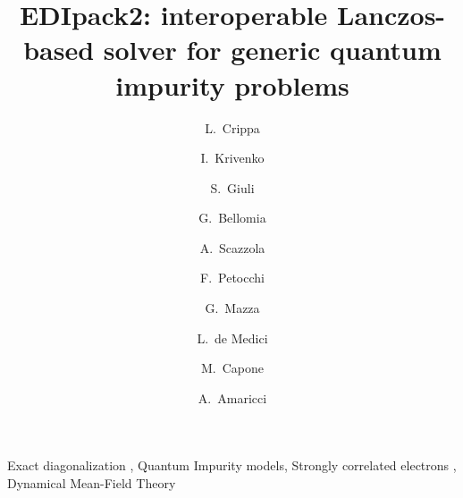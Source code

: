 \documentclass[final,3p,10pt]{elsarticle}
\begin{document}
\begin{frontmatter}

\title{EDIpack2: interoperable Lanczos-based solver for generic quantum impurity problems}
\author[a,b,c]{L.~Crippa}
\author[a]{I.~Krivenko}
\author[d]{S.~Giuli}
\author[d]{G.~Bellomia}
\author[e]{A.~Scazzola}
\author[f]{F.~Petocchi}
\author[g]{G.~Mazza}
\author[h]{L.~de Medici}
\author[d]{M.~Capone}
\author[i]{A.~Amaricci}

\newcommand{\CNRIOM}{CNR-IOM, Istituto Officina dei Materiali,
  Consiglio Nazionale delle Ricerche, Via Bonomea 265, 34136
  Trieste, Italy}
\newcommand{\SISSA}{Scuola Internazionale Superiore di Studi Avanzati (SISSA),
  Via Bonomea 265, 34136 Trieste, Italy}
\newcommand{\ITPHamburg}{I. Institute of Theoretical Physics,
  University of Hamburg, Notkestrasse 9, 22607 Hamburg, Germany}
\newcommand{\WZBURG}{Institut f\"ur Theoretische Physik und
  Astrophysik,Universit\"at W\"urzburg, 97074 W\"urzburg, Germany}
\newcommand{\CTQMAT}{W\"urzburg-Dresden Cluster of Excellence ct.qmat, 01062 Dresden, Germany}
\newcommand{\Geneve}{Department of Quantum Matter Physics, University of
  Geneva, Quai Ernest-Ansermet 24, 1211 Geneva, Switzerland}
\newcommand{\UPISA}{Department of Physics ``E. Fermi'' University of
  Pisa, Largo B. Pontecorvo 3, 56127 Pisa, Italy}
\newcommand{\ESPCI}{LPEM, ESPCI Paris, PSL Research University, CNRS, Sorbonne Universit\'e, 75005 Paris, France}

\address[a]{\ITPHamburg}
\address[b]{\CTQMAT}
\address[c]{\WZBURG}
\address[d]{\SISSA}
\address[e]{Politecnico di Torino, Turin, Italy}
\address[f]{\Geneve}
\address[g]{\UPISA}
\address[h]{\ESPCI}
\address[i]{\CNRIOM}

\begin{abstract}
  
\end{abstract}

\begin{keyword}
  Exact diagonalization \sep
  Quantum Impurity models\sep  
  Strongly correlated electrons \sep  
  Dynamical Mean-Field Theory
\end{keyword}

\end{frontmatter}
\end{document}
